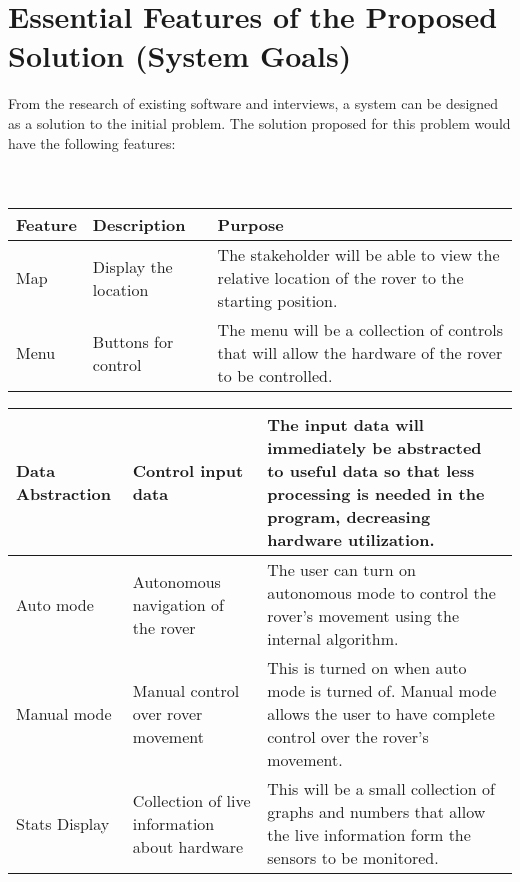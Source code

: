 \documentclass[11pt]{report}
\begin{document}
\section{Essential Features of the Proposed Solution (System Goals)}
	From the research of existing software and interviews, a system can be designed as a solution to the initial problem. The solution proposed for this problem would have the following features:
	~\\\\\\
	\begin{tabularx}{1\textwidth} { 
		  | >{\centering\arraybackslash}X 
		  | >{\centering\arraybackslash}X 
		  | >{\centering\arraybackslash}X | }
			 \hline
			 	\textbf{Feature} & \textbf{Description} & \textbf{Purpose} \\
			 \hline
			 	Map  & Display the location  & The stakeholder will be able to view the relative location of the rover to the starting position.  \\
			 \hline
			 	Menu & Buttons for control & The menu will be a collection of controls that will allow the hardware of the rover to be controlled. \\
			\hline
	\end{tabularx}
	\begin{tabularx}{1\textwidth} { 
		  | >{\centering\arraybackslash}X 
		  | >{\centering\arraybackslash}X 
		  | >{\centering\arraybackslash}X | }
			  \hline
			 	Data Abstraction & Control input data & The input data will immediately be abstracted to useful data so that less processing is needed in the program, decreasing hardware utilization. \\
			 \hline
			 	Auto mode & Autonomous navigation of the rover & The user can turn on autonomous mode to control the rover's movement using the internal algorithm. \\
			 \hline
			 	Manual mode & Manual control over rover movement & This is turned on when auto mode is turned of. Manual mode allows the user to have complete control over the rover's movement.\\
			 \hline
			 	Stats Display & Collection of live information about hardware & This will be a small collection of graphs and numbers that allow the live information form the sensors to be monitored. \\
			\hline
	\end{tabularx}
	~\\
\end{document}
